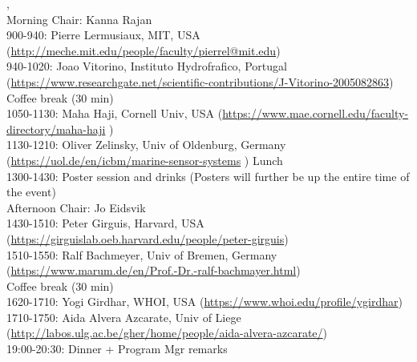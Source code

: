 
\newpage


\vspace{3mm}

, \\
Morning Chair: Kanna Rajan\\
900-940: Pierre Lermusiaux, MIT, USA (\url{http://meche.mit.edu/people/faculty/pierrel@mit.edu})\\
940-1020: Joao Vitorino, Instituto Hydrofrafico, Portugal (\url{https://www.researchgate.net/scientific-contributions/J-Vitorino-2005082863})\\
Coffee break (30 min)\\
1050-1130: Maha Haji, Cornell Univ, USA (\url{https://www.mae.cornell.edu/faculty-directory/maha-haji} )\\
1130-1210: Oliver Zelinsky, Univ of Oldenburg, Germany (\url{https://uol.de/en/icbm/marine-sensor-systems} )
Lunch \\
1300-1430: Poster session and drinks (Posters will further be up the entire time of the event) \\
Afternoon Chair: Jo Eidsvik \\
1430-1510: Peter Girguis, Harvard, USA (\url{https://girguislab.oeb.harvard.edu/people/peter-girguis}) \\
1510-1550: Ralf Bachmeyer, Univ of Bremen, Germany (\url{https://www.marum.de/en/Prof.-Dr.-ralf-bachmayer.html})\\
Coffee break (30 min)\\
1620-1710: Yogi Girdhar, WHOI, USA (\url{https://www.whoi.edu/profile/ygirdhar}) \\
1710-1750: Aida Alvera Azcarate, Univ of Liege (\url{http://labos.ulg.ac.be/gher/home/people/aida-alvera-azcarate/})\\
19:00-20:30: Dinner + Program Mgr remarks

\vspace{5mm}

